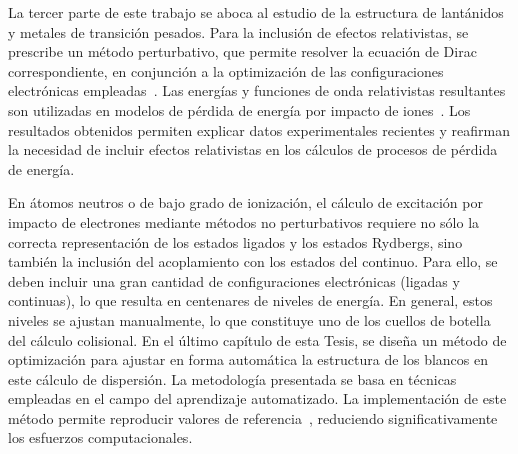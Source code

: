 La tercer parte de este trabajo se aboca al estudio de la estructura de 
lantánidos y metales de transición pesados. Para la inclusión de efectos 
relativistas, se prescribe un método perturbativo, que permite resolver 
la ecuación de Dirac correspondiente, en conjunción a la optimización de 
las configuraciones electrónicas empleadas~\cite{Mendez:19relat}. Las 
energías y funciones de onda relativistas resultantes son utilizadas en 
modelos de pérdida de energía por impacto de iones~\cite{Montanari:20}. 
Los resultados obtenidos permiten explicar datos experimentales 
recientes y reafirman la necesidad de incluir efectos relativistas en 
los cálculos de procesos de pérdida de energía. 

En átomos neutros o de bajo grado de ionización, el cálculo de 
excitación por impacto de electrones mediante métodos no perturbativos 
requiere no sólo la correcta representación de los estados ligados y los 
estados Rydbergs, sino también la inclusión del acoplamiento con los 
estados del continuo. Para ello, se deben incluir una gran cantidad de 
configuraciones electrónicas (ligadas y continuas), lo que resulta en 
centenares de niveles de energía. En general, estos niveles se ajustan 
manualmente, lo que constituye uno de los cuellos de botella del cálculo 
colisional. En el último capítulo de esta Tesis, se diseña un método de 
optimización para ajustar en forma automática la estructura de los 
blancos en este cálculo de dispersión. La metodología presentada se 
basa en técnicas empleadas en el campo del aprendizaje automatizado. La 
implementación de este método permite reproducir valores de 
referencia~\cite{Mendez:20baye,Mendez:prep}, reduciendo 
significativamente los esfuerzos computacionales. 



